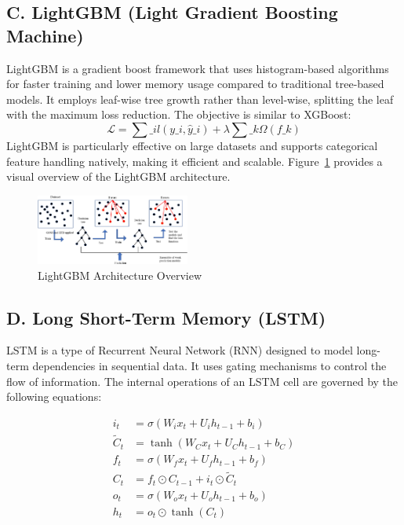 \documentclass{ifacconf}
\begin{document}
\subsection{C. LightGBM (Light Gradient Boosting Machine)}
LightGBM is a gradient boost framework that uses histogram-based algorithms for faster training and lower memory usage compared to traditional tree-based models. It employs leaf-wise tree growth rather than level-wise, splitting the leaf with the maximum loss reduction. The objective is similar to XGBoost\cite{ke2017lightgbm}:
\begin{equation}
\mathcal{L} = \sum\_{i} l(y\_i, \hat{y}\_i) + \lambda \sum\_k \Omega(f\_k)
\end{equation}
LightGBM is particularly effective on large datasets and supports categorical feature handling natively, making it efficient and scalable.
Figure~\ref{fig:lightgmb} provides a visual overview of the LightGBM architecture.
\begin{figure}[h]
  \centering
  \includegraphics[width=0.45\textwidth]{lightgmb.png}
  \caption{LightGBM Architecture Overview \cite{Deborah2024}}
  \label{fig:lightgmb}
\end{figure}

\subsection{D. Long Short-Term Memory (LSTM)}

LSTM is a type of Recurrent Neural Network (RNN) designed to model long-term dependencies in sequential data. It uses gating mechanisms to control the flow of information. The internal operations of an LSTM cell are governed by the following equations:

\begin{align}
i_t &= \sigma(W_i x_t + U_i h_{t-1} + b_i) \\
\tilde{C}_t &= \tanh(W_C x_t + U_C h_{t-1} + b_C) \\
f_t &= \sigma(W_f x_t + U_f h_{t-1} + b_f) \\
C_t &= f_t \odot C_{t-1} + i_t \odot \tilde{C}_t \\
o_t &= \sigma(W_o x_t + U_o h_{t-1} + b_o) \\
h_t &= o_t \odot \tanh(C_t)
\end{align}
\end{document}
